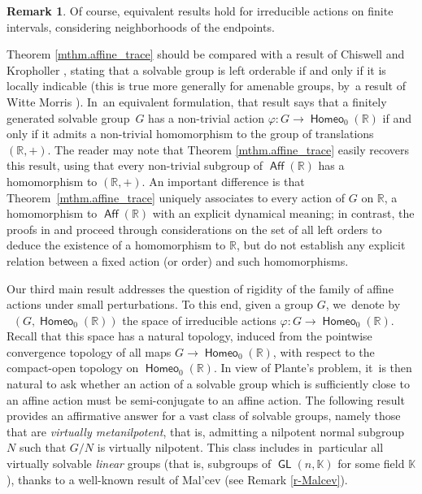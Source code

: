 \documentclass[JEP,XML,SOM,Unicode,NoFloatCountersInSection,published]{cedram}
\theoremstyle{definition}
\newtheorem{rem}[thm]{Remark}
\DeclareMathOperator{\Aff}{\mathsf{Aff}}
\DeclareMathOperator{\homeo}{\mathsf{Homeo}}
\DeclareMathOperator{\Homirr}{\mathsf{Hom}_{\mathrm{irr}}}
\DeclareMathOperator{\GL}{\mathsf{GL}}
\newcommand{\R}{\mathbb{R}}
\begin{document}
\begin{rem}
Of course, equivalent results hold for irreducible actions on finite intervals, considering neighborhoods of the endpoints.
\end{rem}

Theorem \ref{mthm.affine_trace} should be compared with a result of Chiswell and Kropholler \cite{ChiswellKropholler}, stating that a solvable group is left orderable if and only if it is locally indicable (this is true more generally for amenable groups, by~a result of Witte Morris \cite{WitteMorris}). In~an equivalent formulation, that result says that a finitely generated solvable group~$G$ has a non-trivial action $\varphi\colon G \to \homeo_0(\R)$ if and only if it admits a non-trivial homomorphism to the group of translations $(\R, +)$. The reader may note that Theorem \ref{mthm.affine_trace} easily recovers this result, using that every non-trivial subgroup of $\Aff(\R)$ has a homomorphism to $(\R, +)$. An important difference is that Theorem~\ref{mthm.affine_trace} uniquely associates to every action of $G$ on $\R$, a homomorphism to $\Aff(\R)$ with an explicit dynamical meaning; in contrast, the proofs in \cite{ChiswellKropholler} and \cite{WitteMorris} proceed through considerations on the set of all left orders to deduce the existence of a homomorphism to $\R$, but do not establish any explicit relation between a fixed action (or order) and such homomorphisms.

Our third main result addresses the question of {rigidity} of the family of affine actions under small perturbations. To this end, given a group $G$, we~denote by $\Homirr(G, \homeo_0(\R))$ the space of irreducible actions $\varphi\colon G\to \homeo_0(\R)$. Recall that this space has a natural topology, induced from the pointwise convergence topology of all maps $G\to \homeo_0(\R)$, with respect to the compact-open topology on $\homeo_0(\R)$. In view of Plante's problem, it~is then natural to ask whether an action of a solvable group which is sufficiently close to an affine action must be semi-conjugate to an affine action. The following result provides an affirmative answer for a vast class of solvable groups, namely those that are \emph{virtually metanilpotent}, that is, admitting a nilpotent normal subgroup $N$ such that $G/N$ is virtually nilpotent. This class includes in~particular all virtually solvable \emph{linear} groups (that is, subgroups of $\GL(n, \mathbb{K})$ for some field $\mathbb{K}$), thanks to a well-known result of Mal'cev \cite{Malcev} (see Remark \ref{r-Malcev}).
\end{document}
